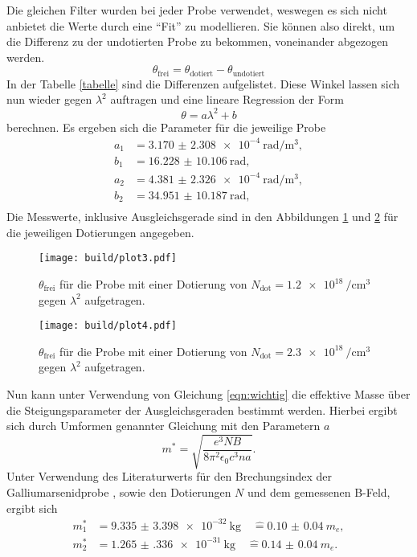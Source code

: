 Die gleichen Filter wurden bei jeder Probe verwendet, weswegen es sich nicht anbietet die Werte durch eine \enquote{Fit} zu modellieren.
Sie können also direkt, um die Differenz zu der undotierten Probe zu bekommen, voneinander abgezogen werden.
\begin{equation}
\theta_{\text{frei}} = \theta_{\text{dotiert}} - \theta_{\text{undotiert}}
\end{equation}
In der Tabelle \ref{tabelle} sind die Differenzen aufgelistet. Diese Winkel lassen sich nun wieder gegen $\lambda^2$ auftragen und eine lineare Regression
der Form
\begin{equation}
\theta = a \lambda^2 + b
\end{equation}
berechnen.
Es ergeben sich die Parameter für die jeweilige Probe
\begin{align*}
a_{1} &= \SI{3.170(2308)e-4}{\radian\per\meter\tothe{3}},\\
b_{1} &= \SI{16.228(10106)}{\radian}, \\
a_{2} &= \SI{4.381(2326)e-4}{\radian\per\meter\tothe{3}},\\
b_{2} &= \SI{34.951(10187)}{\radian}, \\
\end{align*}
Die Messwerte, inklusive Ausgleichsgerade sind in den Abbildungen \ref{plt1} und \ref{plt2} für die jeweiligen Dotierungen angegeben.
\begin{figure}
    \centering
    \texttt{[image: build/plot3.pdf]}
    \caption{$\theta_{\text{frei}}$ für die Probe mit einer Dotierung von $N_{\text{dot}}=\SI{1.2e18}{\per\centi\meter\tothe{3}}$ gegen $\lambda^2$ aufgetragen.}
    \label{plt1}
\end{figure}
\begin{figure}
    \centering
    \texttt{[image: build/plot4.pdf]}
    \caption{$\theta_{\text{frei}}$ für die Probe mit einer Dotierung von $N_{\text{dot}}=\SI{2.3e18}{\per\centi\meter\tothe{3}}$ gegen $\lambda^2$ aufgetragen.}
    \label{plt2}
\end{figure}
Nun kann unter Verwendung von Gleichung \eqref{eqn:wichtig} die effektive Masse über die Steigungsparameter der Ausgleichsgeraden bestimmt werden.
Hierbei ergibt sich durch Umformen genannter Gleichung mit den Parametern $a$
\begin{equation}
m^{*} = \sqrt{\frac{e^3 NB}{8 \pi^2 \epsilon_0 c^3 n a}}.
\end{equation}
Unter Verwendung des Literaturwerts für den Brechungsindex der Galliumarsenidprobe \cite{GaAs}, sowie den Dotierungen $N$ und dem gemessenen B-Feld, ergibt sich
\begin{align}
m_1^{*} &= \SI{9.335(3398)e-32}{\kilo\gram} \quad \hat{=} \SI{0.10(4)}{}m_e,\\
m_2^{*} &= \SI{1.265(336)e-31}{\kilo\gram} \quad \hat{=} \SI{0.14(4)}{}m_e.
\end{align}
